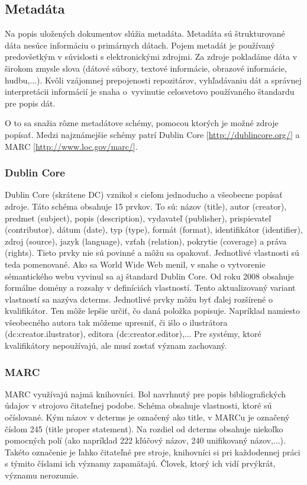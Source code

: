 \documentclass[thesis=M,slovak]{FITthesis}[2013/05/06]
\begin{document}
\subsection{Metadáta}
Na popis uložených dokumentov slúžia metadáta. Metadáta sú štrukturované dáta nesúce informáciu o primárnych dátach. Pojem metadát je používaný predovšetkým v súvislosti s elektronickými zdrojmi. \cite{iso8459-5} Za zdroje pokladáme dáta v širokom zmysle slova (dátové súbory, textové informácie, obrazové informácie, hudbu,...). Kvôli vzájomnej prepojenosti repozitárov, vyhľadávaniu dát a správnej interpretácii informácií je snaha o~vyvinutie celosvetovo používaného štandardu pre popis dát. 

O to sa snažia rôzne metadátove schémy, pomocou ktorých je možné zdroje popísať. Medzi najznámejšie schémy patrí Dublin Core [\url{http://dublincore.org/}] a MARC [\url{http://www.loc.gov/marc/}].

\subsubsection{Dublin Core}
Dublin Core (skrátene DC) vznikol s cieľom jednoducho a všeobecne popísať zdroje. Táto schéma obsahuje 15 prvkov. To sú: názov (title), autor (creator), predmet (subject), popis (description), vydavateľ (publisher), prispievateľ (contributor), dátum (date), typ (type), formát (format), identifikátor (identifier), zdroj (source), jazyk (language), vzťah (relation), pokrytie (coverage) a práva (rights). Tieto prvky nie sú povinné a môžu sa opakovať. Jednotlivé vlastnosti sú teda pomenované. Ako sa World Wide Web menil, v snahe o vytvorenie sémantického webu vyvinul sa aj štandard Dublin Core. Od roku 2008 obsahuje formálne domény a rozsahy v definíciách vlastností. Tento aktualizovaný variant vlastností sa nazýva dcterms. Jednotlivé prvky môžu byť ďalej rozšírené o kvalifikátor. Ten môže lepšie určiť, čo daná položka popisuje. Napríklad namiesto všeobecného autora tak môžeme upresniť, či išlo o ilustrátora (dc:creator.ilustrator), editora (dc:creator.editor),...  Pre systémy, ktoré kvalifikátory nepoužívajú, ale musí zostať význam zachovaný.

\subsubsection{MARC}
MARC využívajú najmä knihovníci. Bol navrhnutý pre popis bibliografických údajov v strojovo čitateľnej podobe.
Schéma obsahuje vlastnosti, ktoré sú očíslované. Kým názov v dcterms je označený ako title, v MARCu  je označený číslom 245 (title proper statement). Na rozdiel od dcterms obsahuje niekoľko pomocných polí (ako napríklad 222 kľúčový názov, 240 unifikovaný názov,...). Takéto označenie je ľahko čitateľné pre stroje, knihovníci si pri každodennej práci s týmito číslami ich významy zapamätajú. Človek, ktorý ich vidí prvýkrát, významu nerozumie.
\end{document}
